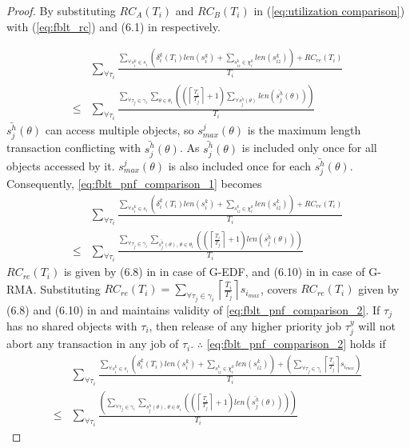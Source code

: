 \documentclass[12pt,english]{report}
\newtheorem{proof}{Proof}
\begin{document}
\begin{proof}

By substituting $RC_{A}(T_{i})$ and $RC_{B}(T_{i})$ in (\ref{eq:utilization comparison})
with (\ref{eq:fblt_rc}) and (6.1) in \cite{shambake_phd_proposal}
respectively. 

\begin{eqnarray}
 & \sum_{\forall\tau_{i}}\frac{\sum_{\forall s_{i}^{k}\in s_{i}}\left(\delta_{i}^{k}(T_{i})len(s_{i}^{k})+\sum_{s_{iz}^{k}\in\chi_{i}^{k}}len(s_{iz}^{k})\right)+RC_{re}(T_{i})}{T_{i}}\label{eq:fblt_pnf_comparison_1}\\
\le & \sum_{\forall\tau_{i}}\frac{\sum_{\forall\tau_{j}\in\gamma_{i}}\sum_{\theta\in\theta_{i}}\left(\left(\left\lceil \frac{T_{i}}{T_{j}}\right\rceil +1\right)\sum_{\forall\bar{s_{j}^{h}}(\theta)}len\left(\bar{s_{j}^{h}}(\theta)\right)\right)}{T_{i}}\nonumber 
\end{eqnarray}
$\bar{s_{j}^{h}}(\theta)$ can access multiple objects, so $s_{max}^{j}(\theta)$
is the maximum length transaction conflicting with $\bar{s_{j}^{h}}(\theta)$.
As $\bar{s_{j}^{h}}(\theta)$ is included only once for all objects
accessed by it. $s_{max}^{j}(\theta)$ is also included once for each
$\bar{s_{j}^{h}}(\theta)$. Consequently, \ref{eq:fblt_pnf_comparison_1}
becomes 
\begin{eqnarray}
 & \sum_{\forall\tau_{i}}\frac{\sum_{\forall s_{i}^{k}\in s_{i}}\left(\delta_{i}^{k}(T_{i})len(s_{i}^{k})+\sum_{s_{iz}^{k}\in\chi_{i}^{k}}len(s_{iz}^{k})\right)+RC_{re}(T_{i})}{T_{i}}\label{eq:fblt_pnf_comparison_2}\\
\le & \sum_{\forall\tau_{i}}\frac{\sum_{\forall\tau_{j}\in\gamma_{i}}\sum_{\bar{s_{j}^{h}}(\theta),\,\theta\in\theta_{i}}\left(\left(\left\lceil \frac{T_{i}}{T_{j}}\right\rceil +1\right)len\left(\bar{s_{j}^{h}}(\theta)\right)\right)}{T_{i}}\nonumber 
\end{eqnarray}
$RC_{re}(T_{i})$ is given by (6.8) in \cite{shambake_phd_proposal}
in case of G-EDF, and (6.10) in \cite{shambake_phd_proposal} in case
of G-RMA. Substituting $RC_{re}(T_{i})=\sum_{\forall\tau_{j}\in\gamma_{i}}\left\lceil \frac{T_{i}}{T_{j}}\right\rceil s_{i_{max}}$,
covers $RC_{re}(T_{i})$ given by (6.8) and (6.10) in \cite{shambake_phd_proposal}
and maintains validity of \ref{eq:fblt_pnf_comparison_2}. If $\tau_{j}$
has no shared objects with $\tau_{i}$, then release of any higher
priority job $\tau_{j}^{y}$ will not abort any transaction in any
job of $\tau_{i}$. $\therefore$ \ref{eq:fblt_pnf_comparison_2}
holds if 
\begin{eqnarray}
 & \sum_{\forall\tau_{i}}\frac{\sum_{\forall s_{i}^{k}\in s_{i}}\left(\delta_{i}^{k}(T_{i})len(s_{i}^{k})+\sum_{s_{iz}^{k}\in\chi_{i}^{k}}len(s_{iz}^{k})\right)+\left(\sum_{\forall\tau_{j}\in\gamma_{i}}\left\lceil \frac{T_{i}}{T_{j}}\right\rceil s_{i_{max}}\right)}{T_{i}}\label{eq:fblt_pnf_comparison_9}\\
\le & \sum_{\forall\tau_{i}}\frac{\left(\sum_{\forall\tau_{j}\in\gamma_{i}}\sum_{\bar{s_{j}^{h}}(\theta),\,\theta\in\theta_{i}}\left(\left(\left\lceil \frac{T_{i}}{T_{j}}\right\rceil +1\right)len\left(\bar{s_{j}^{h}}(\theta)\right)\right)\right)}{T_{i}}\nonumber 
\end{eqnarray}



\end{proof}
\end{document}
